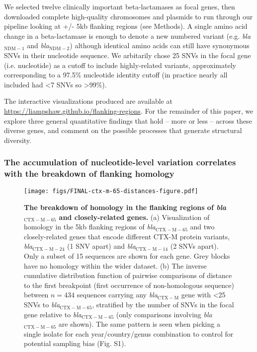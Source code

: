 \documentclass[rmp,superscriptaddress,11pt]{revtex4-1}
\newcommand{\bla}[1]{\textit{bla}$_\mathrm{#1}$}
\begin{document}
We selected twelve clinically important beta-lactamases as focal genes, then downloaded complete high-quality chromosomes and plasmids to run through our pipeline looking at +/- 5kb flanking regions (see Methods). A single amino acid change in a beta-lactamase is enough to denote a new numbered variant (e.g.  \bla{NDM-1} and \bla{NDM-2}) although identical amino acids can still have synonymous SNVs in their nucleotide sequence. We arbitarily chose 25 SNVs in the focal gene (i.e. nucleotide) as a cutoff to include highly-related variants, approximately corresponding to a 97.5\% nucleotide identity cutoff (in practice nearly all included had <7 SNVs so >99\%). \par

The interactive visualizations produced are available at \href{https://liampshaw.github.io/flanking-regions}{https://liampshaw.github.io/flanking-regions}. For the remainder of this paper, we explore three general quantitative findings that hold {--} more or less {--} across these diverse genes, and comment on the possible processes that generate structural diversity.

\subsubsection{The accumulation of nucleotide-level variation correlates with the breakdown of flanking homology}

\begin{figure}
    \centering
    \texttt{[image: figs/FINAL-ctx-m-65-distances-figure.pdf]}
    \caption{\textbf{The breakdown of homology in the flanking regions of \bla{CTX-M-65} and closely-related genes.} (a) Visualization of homology in the 5kb flanking regions of \bla{CTX-M-65} and two closely-related genes that encode different CTX-M protein variants, \bla{CTX-M-24} (1 SNV apart) and \bla{CTX-M-14} (2 SNVs apart). Only a subset of 15 sequences are shown for each gene. Grey blocks have no homology within the wider dataset. (b) The inverse cumulative distribution function of pairwise comparisons of distance to the first breakpoint (first occurrence of non-homologous sequence) between $n=434$ sequences carrying any \bla{CTX-M} gene with <25 SNVs to \bla{CTX-M-65}, stratified by the number of SNVs in the focal gene relative to \bla{CTX-M-65} (only comparisons involving \bla{CTX-M-65} are shown). The same pattern is seen when picking a single isolate for each year/country/genus combination to control for potential sampling bias (Fig. S1).}
    \label{fig:CTX-M-65}
\end{figure}
\end{document}
